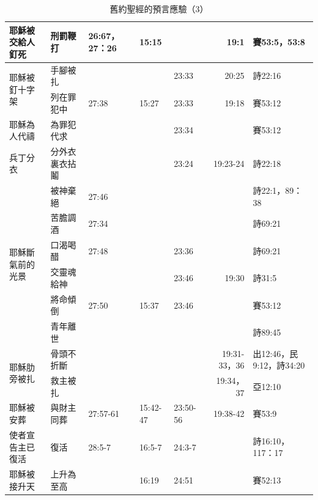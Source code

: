 \begin{table}[htbp]
\begin{tabular}{|p{8.72em}|p{7.11em}|p{4.445em}|p{4.39em}|p{4.165em}|r|p{8.39em}|}
    \midrule
    耶穌被交給人釘死 & 刑罰鞭打  & 26:67，27：26 & 15:15 & \multicolumn{1}{r|}{} & \multicolumn{1}{p{4.055em}|}{19:1} & 賽53:5，53:8 \\
    \midrule
    \multirow{2}[4]{*}{耶穌被釘十字架} & 手腳被扎  &  & \multicolumn{1}{r|}{} & 23:33 & \multicolumn{1}{p{4.055em}|}{20:25} & 詩22:16 \\
\cmidrule{2-7}    \multicolumn{1}{|r|}{} & 列在罪犯中 & 27:38 & 15:27 & 23:33 & \multicolumn{1}{p{4.055em}|}{19:18} & 賽53:12 \\
    \midrule
    耶穌為人代禱 & 為罪犯代求 &  & \multicolumn{1}{r|}{} & 23:34 &       & 賽53:12 \\
    \midrule
    兵丁分衣  & 分外衣裏衣拈鬮 &       & \multicolumn{1}{r|}{} & 23:24 & \multicolumn{1}{p{4.055em}|}{19:23-24} & 詩22:18 \\
    \midrule
    \multirow{6}[12]{*}{耶穌斷氣前的光景} & 被神棄絕  & 27:46 & \multicolumn{1}{r|}{} & \multicolumn{1}{r|}{} &       & 詩22:1，89：38 \\
\cmidrule{2-7}    \multicolumn{1}{|r|}{} & 苦膽調酒  & 27:34 & \multicolumn{1}{r|}{} & \multicolumn{1}{r|}{} &       & 詩69:21 \\
\cmidrule{2-7}    \multicolumn{1}{|r|}{} & 口渴喝醋  & 27:48 & \multicolumn{1}{r|}{} & 23:36 &       & 詩69:21 \\
\cmidrule{2-7}    \multicolumn{1}{|r|}{} & 交靈魂給神 &  & \multicolumn{1}{r|}{} & 23:46 & \multicolumn{1}{p{4.055em}|}{19:30} & 詩31:5 \\
\cmidrule{2-7}    \multicolumn{1}{|r|}{} & 將命傾倒  & 27:50 & 15:37 & 23:46 &       & 賽53:12 \\
\cmidrule{2-7}    \multicolumn{1}{|r|}{} & 青年離世  &       & \multicolumn{1}{r|}{} & \multicolumn{1}{r|}{} &       & 詩89:45 \\
    \midrule
    \multirow{2}[4]{*}{耶穌肋旁被扎} & 骨頭不折斷 &  & \multicolumn{1}{r|}{} & \multicolumn{1}{r|}{} & \multicolumn{1}{p{4.055em}|}{19:31-33，36} & 出12:46，民9:12，詩34:20 \\
\cmidrule{2-7}    \multicolumn{1}{|r|}{} & 救主被扎  & & \multicolumn{1}{r|}{} & \multicolumn{1}{r|}{} & \multicolumn{1}{p{4.055em}|}{ 19:34，37} & 亞12:10 \\
    \midrule
    耶穌被安葬 & 與財主同葬 &  27:57-61 &  15:42-47 &  23:50-56 & \multicolumn{1}{p{4.055em}|}{ 19:38-42} & 賽53:9 \\
    \midrule
    使者宣告主已復活 & 復活    &  28:5-7 &  16:5-7 &  24:3-7 &       & 詩16:10，117：17 \\
    \midrule
    耶穌被接升天 & 上升為至高 &  & 16:19 &  24:51 &       & 賽52:13 \\
    \bottomrule  
 
      \end{tabular}%
         \caption{舊約聖經的預言應驗（3）}
  \label{tab:addlabel}%
\end{table}%

